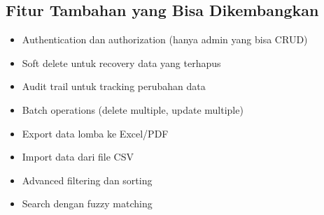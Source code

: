 \documentclass[12pt,a4paper]{article}
\begin{document}
\subsection{Fitur Tambahan yang Bisa Dikembangkan}

\begin{itemize}
    \item Authentication dan authorization (hanya admin yang bisa CRUD)
    \item Soft delete untuk recovery data yang terhapus
    \item Audit trail untuk tracking perubahan data
    \item Batch operations (delete multiple, update multiple)
    \item Export data lomba ke Excel/PDF
    \item Import data dari file CSV
    \item Advanced filtering dan sorting
    \item Search dengan fuzzy matching
\end{itemize}
\end{document}
